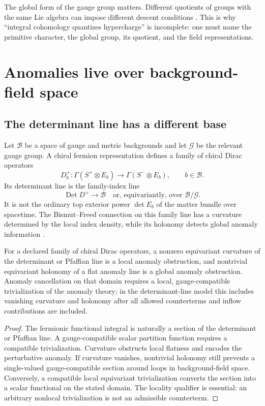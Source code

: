 \documentclass[11pt]{article}
\newcommand{\Det}{\operatorname{Det}}
\newcommand{\Bkg}{\mathcal{B}}
\newcommand{\GaugeGrp}{\mathcal{G}}
\begin{document}
The global form of the gauge group matters. Different quotients of groups
with the same Lie algebra can impose different descent conditions
\cite{Hashimoto2013}. This is why ``integral cohomology quantizes
hypercharge'' is incomplete: one must name the primitive character, the
global group, its quotient, and the field representations.

\section{Anomalies live over background-field space}

\subsection{The determinant line has a different base}

Let \(\Bkg\) be a space of gauge and metric backgrounds and let
\(\GaugeGrp\) be the relevant gauge group. A chiral fermion representation
defines a family of chiral Dirac operators
\[
D_b^+:\Gamma(S^+\otimes E_b)\longrightarrow
\Gamma(S^-\otimes E_b),
\qquad b\in\Bkg.
\]
Its determinant line is the family-index line
\[
\Det D^+\longrightarrow \Bkg
\quad\text{or, equivariantly, over }\Bkg/\GaugeGrp.
\]
It is not the ordinary top exterior power \(\det E_b\) of the matter bundle
over spacetime. The Bismut--Freed connection on this family line has a
curvature determined by the local index density, while its holonomy detects
global anomaly information \cite{Freed1995,Freed2014}.

\begin{theorem}\label{thm:anomaly}
For a declared family of chiral Dirac operators, a nonzero equivariant
curvature of the determinant or Pfaffian line is a local anomaly
obstruction, and nontrivial equivariant holonomy of a flat anomaly line is a
global anomaly obstruction. Anomaly cancellation on that domain requires a
local, gauge-compatible trivialization of the anomaly theory; in the
determinant-line model this includes vanishing curvature and holonomy after
all allowed counterterms and inflow contributions are included.
\end{theorem}

\begin{proof}
The fermionic functional integral is naturally a section of the determinant
or Pfaffian line. A gauge-compatible scalar partition function requires a
compatible trivialization. Curvature obstructs local flatness and encodes
the perturbative anomaly. If curvature vanishes, nontrivial holonomy still
prevents a single-valued gauge-compatible section around loops in
background-field space. Conversely, a compatible local equivariant
trivialization converts the section into a scalar functional on the stated
domain. The locality qualifier is essential: an arbitrary nonlocal
trivialization is not an admissible counterterm.
\end{proof}
\end{document}

